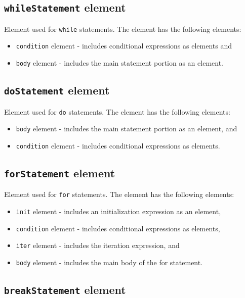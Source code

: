 \subsection{ {\tt whileStatement} element}

Element used for {\tt while} statements. The element has the following elements:

\begin{itemize}
\item {\tt condition} element - includes conditional expressions as elements and
\item {\tt body} element - includes the main statement portion as an element.
\end{itemize}


\subsection{ {\tt doStatement} element}

Element used for {\tt do} statements. The element has the following elements:

\begin{itemize}
\item {\tt body} element - includes the main statement portion as an element, and
\item {\tt condition} element - includes conditional expressions as elements.
\end{itemize}


\subsection{ {\tt forStatement} element}

Element used for {\tt for} statements. The element has the following elements:

\begin{itemize}
\item {\tt init} element - includes an initialization expression as an element,
\item {\tt condition} element - includes conditional expressions as elements,
\item {\tt iter} element  - includes the iteration expression, and
\item {\tt body} element - includes the main body of the for statement.
\end{itemize}


\subsection{ {\tt breakStatement} element}

